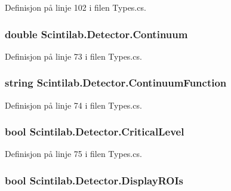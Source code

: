 Definisjon på linje 102 i filen Types.\+cs.

\hypertarget{class_scintilab_1_1_detector_a989e067403b2aff60db811ca0a3338b4}{
\subsubsection[{Continuum}]{\setlength{\rightskip}{0pt plus 5cm}double Scintilab.\+Detector.\+Continuum}}\label{class_scintilab_1_1_detector_a989e067403b2aff60db811ca0a3338b4}


Definisjon på linje 73 i filen Types.\+cs.

\hypertarget{class_scintilab_1_1_detector_a93e4175d688c37df65977e8e8ccc9b0c}{
\subsubsection[{Continuum\+Function}]{\setlength{\rightskip}{0pt plus 5cm}string Scintilab.\+Detector.\+Continuum\+Function}}\label{class_scintilab_1_1_detector_a93e4175d688c37df65977e8e8ccc9b0c}


Definisjon på linje 74 i filen Types.\+cs.

\hypertarget{class_scintilab_1_1_detector_abab4c22c4ed6af134af2029a8e9b848e}{
\subsubsection[{Critical\+Level}]{\setlength{\rightskip}{0pt plus 5cm}bool Scintilab.\+Detector.\+Critical\+Level}}\label{class_scintilab_1_1_detector_abab4c22c4ed6af134af2029a8e9b848e}


Definisjon på linje 75 i filen Types.\+cs.

\hypertarget{class_scintilab_1_1_detector_ac96f9499ed6b860c9d64d7767801fae4}{
\subsubsection[{Display\+R\+O\+Is}]{\setlength{\rightskip}{0pt plus 5cm}bool Scintilab.\+Detector.\+Display\+R\+O\+Is}}\label{class_scintilab_1_1_detector_ac96f9499ed6b860c9d64d7767801fae4}


